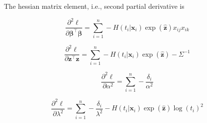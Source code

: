 \documentclass[preprint,12pt]{elsarticle}
\begin{document}
The hessian matrix element, i.e., second partial derivative is 

\begin{equation}
    \frac{\partial^2\ell}{\partial\boldsymbol{\beta}^{\top}\boldsymbol{\beta}}=\sum_{i=1}^n-H(t_i|\mathbf{x}_i)\exp(\hat{\mathbf{z}})x_{ij}x_{ik}
\end{equation}

\begin{equation}
    \frac{\partial^2\ell}{\partial\mathbf{z}^{\top}\mathbf{z}}=\sum_{i=1}^n-H(t_i|\mathbf{x}_i)\exp(\hat{\mathbf{z}})-\Sigma^{-1}
\end{equation}

\begin{equation}
    \frac{\partial^2\ell}{\partial\alpha^2}=\sum_{i=1}^n-\frac{\delta_i}{\alpha^2}
\end{equation}

\begin{equation}
    \frac{\partial^2\ell}{\partial\lambda^2}=\sum_{i=1}^n-\frac{\delta_i}{\lambda^2}-H(t_i|\mathbf{x}_i)\exp(\hat{\mathbf{z}})\log(t_i)^2
\end{equation}
\end{document}
